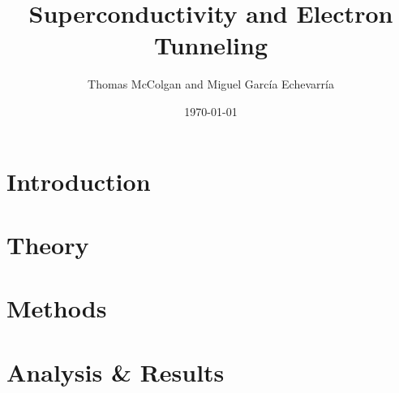 \documentclass{beamer}
\title{\textbf{Superconductivity and Electron Tunneling}}
\author{Thomas McColgan and Miguel Garc\'ia Echevarr\'ia}
\date{\today}
\begin{document}
\frame{\titlepage}

\section{Introduction}
\frame{\tableofcontents}


\section{Theory}


\section{Methods}


\section{Analysis \& Results}

\end{document}
